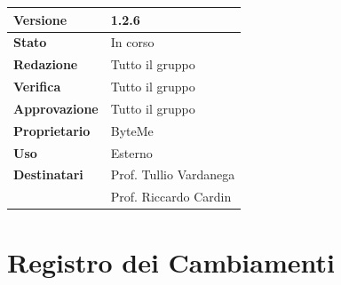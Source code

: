 \documentclass[11pt,a4paper]{article}
\begin{document}
\begin{titlepage}
    \begin{table}[H]
        \centering
        \begin{tabular}{|l|p{5cm}|}
            \hline
            \textbf{Versione} & 1.2.6 \\
            \hline
            \textbf{Stato} & In corso \\
            \hline
            \textbf{Redazione} & Tutto il gruppo \\
            \hline
            \textbf{Verifica} & Tutto il gruppo \\
            \hline
            \textbf{Approvazione} & Tutto il gruppo \\
            \hline
            \textbf{Proprietario} & ByteMe \\
            \hline
            \textbf{Uso} & Esterno \\
            \hline
            \textbf{Destinatari} & Prof. Tullio Vardanega \\ & Prof. Riccardo Cardin \\
            \hline
        \end{tabular}
    \end{table}
    
    \vfill
\end{titlepage}

\thispagestyle{empty}
\section*{Registro dei Cambiamenti}
\end{document}

